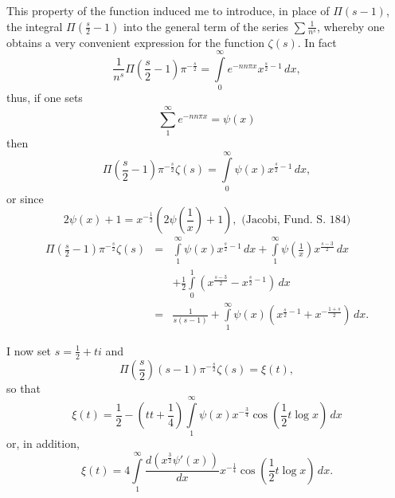 \documentclass[a4paper,12pt]{article}
\begin{document}
This property of the function induced me to introduce,
in place of $\Pi(s - 1)$, the integral
$\displaystyle \Pi \left( \frac{s}{2} - 1 \right)$ into the
general term of the series $\displaystyle \sum \frac{1}{n^s}$,
whereby one obtains a very convenient expression for the function
$\zeta(s)$.  In fact
\[ \frac{1}{n^s} \Pi \left( \frac{s}{2} - 1 \right) \pi^{-\frac{s}{2}}
   = \int\limits_0^\infty e^{-nn\pi x} x^{\frac{s}{2} - 1} \,dx,\]
thus, if one sets
\[ \sum_1^\infty e^{-nn\pi x} = \psi(x) \]
then
\[ \Pi \left( \frac{s}{2} - 1 \right) \pi^{-\frac{s}{2}} \zeta(s)
   = \int\limits_0^\infty \psi(x) x^{\frac{s}{2} - 1} \,dx,\]
or since
\[ 2 \psi(x) + 1 = x^{-\frac{1}{2}} \left(
         2\psi \left( \frac{1}{x} \right) + 1 \right),
   \mbox{ (Jacobi, Fund. S. 184)}\]
\begin{eqnarray*}
\Pi \left( \frac{s}{2} - 1 \right) \pi^{-\frac{s}{2}} \zeta(s)
   &=& \int\limits_1^\infty \psi(x) x^{\frac{s}{2} - 1} \,dx
      + \int\limits_1^\infty \psi \left( \frac{1}{x} \right)
            x^{\frac{s-3}{2}} \,dx \\
   & &+ {\textstyle\frac{1}{2}} \int\limits_0^1 \left(
            x^{\frac{s-3}{2}} - x^{\frac{s}{2} - 1}
            \right) \,dx \\
   &=& \frac{1}{s(s-1)} + \int\limits_1^\infty \psi(x) \left(
            x^{\frac{s}{2} - 1} + x^{-\frac{1+s}{2}}
            \right) \,dx.
\end{eqnarray*}

I now set $s = \frac{1}{2} + ti$ and
\[ \Pi \left( \frac{s}{2} \right) (s - 1) \pi^{-\frac{s}{2}} \zeta(s)
   = \xi(t),\]
so that
\[ \xi(t) = {\textstyle\frac{1}{2}}
      - (tt + {\textstyle\frac{1}{4}}) \int\limits_1^\infty
         \psi(x) x^{-\frac{3}{4}}
         \cos ({\textstyle\frac{1}{2}}t \log x) \,dx \]
or, in addition,
\[ \xi(t)
   = 4 \int\limits_1^\infty \frac{d(x^{\frac{3}{2}} \psi'(x))}{dx}
          x^{-\frac{1}{4}} \cos ({\textstyle\frac{1}{2}}t \log x) \,dx.\]
\end{document}
